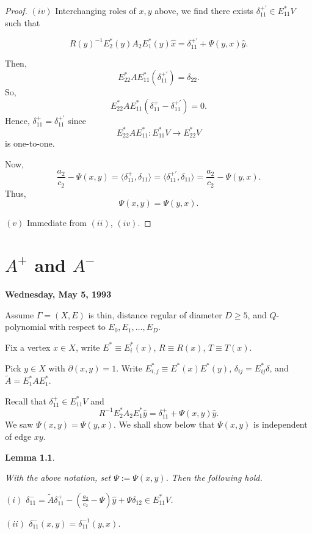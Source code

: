 \documentclass[
]{book}
\newtheorem{lemma}{Lemma}[chapter]
\theoremstyle{definition}
\theoremstyle{definition}
\theoremstyle{definition}
\theoremstyle{definition}
\theoremstyle{remark}
\begin{document}
\begin{proof}
\((iv)\) Interchanging roles of \(x, y\) above, we find there exists \(\delta^{+'}_{11}\in E^*_{11}V\) such that

\[R(y)^{-1}E^*_2(y)A_2E^*_1(y)\hat{x} = \delta^{+'}_{11} + \Psi(y,x)\hat{y}.\]

Then,
\[E^*_{22}AE^*_{11}(\delta^{+'}_{11}) = \delta_{22}.\]
So,
\[E^*_{22}AE^*_{11}(\delta^{+}_{11}-\delta^{+'}_{11}) = 0.\]
Hence, \(\delta^+_{11} = \delta^{+'}_{11}\) since
\[E^*_{22}AE^*_{11}: E^*_{11}V \to E^*_{22}V\]
is one-to-one.

Now,
\[\frac{a_2}{c_2}-\Psi(x,y) = \langle \delta^+_{11}, \delta_{11}\rangle = \langle \delta^{+'}_{11}, \delta_{11}\rangle = \frac{a_2}{c_2}-\Psi(y,x).\]
Thus,
\[\Psi(x,y) = \Psi(y,x).\]

\((v)\) Immediate from \((ii)\), \((iv)\).

\end{proof}

\hypertarget{lec39}{%
\chapter{\texorpdfstring{\(A^+\) and \(A^-\)}{A\^{}+ and A\^{}-}}\label{lec39}}

\textbf{Wednesday, May 5, 1993}

Assume \(\Gamma = (X, E)\) is thin, distance regular of diameter \(D\geq 5\), and \(Q\)-polynomial with respect to \(E_0, E_1, \ldots, E_D\).

Fix a vertex \(x\in X\), write \(E^*\equiv E^*_i(x)\), \(R\equiv R(x)\), \(T\equiv T(x)\).

Pick \(y\in X\) with \(\partial(x,y) = 1\). Write \(E^*_{i,j} \equiv E^*(x)E^*(y)\), \(\delta_{ij} = E^*_{ij}\delta\), and \(\tilde{A} = E^*_1AE^*_1\).

Recall that \(\delta^+_{11}\in E^*_{11}V\) and
\[R^{-1}E^*_2A_2E^*_1\hat{y} = \delta^+_{11} + \Psi(x,y)\hat{y}.\]
We saw \(\Psi(x,y) = \Psi(y,x)\). We shall show below that \(\Psi(x,y)\) is independent of edge \(xy\).

\begin{lemma}
\protect\hypertarget{lem:delta-minus11}{}\label{lem:delta-minus11}

With the above notation, set \(\Psi:=\Psi(x,y)\). Then the following hold.

\((i)\) \(\delta^-_{11} = \tilde{A}\delta^+_{11} - \left( \frac{a_2}{c_2} - \Psi\right)\hat{y} + \Psi \delta_{12}\in E^*_{11}V\).

\((ii)\) \(\delta^-_{11}(x,y) = \delta^{-1}_{11}(y,x)\).

\end{lemma}
\end{document}

